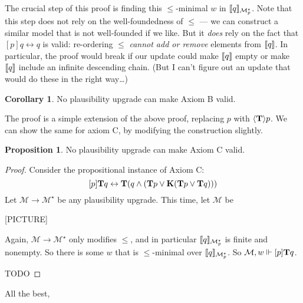 \documentclass[letterpaper]{article}
\theoremstyle{definition}
\newtheorem{corollary}{Corollary}
\newtheorem{proposition}{Proposition}
\newcommand{\semantics}[1]{[\![\mbox{\em $ #1 $\/}]\!]}
\newcommand{\Model}{\mathcal{M}}
\newcommand{\Typ}[1]{\textrm{\textup{\textbf{T}}} #1}
\newcommand{\Know}[1]{\textrm{\textup{\textbf{K}}} #1}
\newcommand{\Update}[1]{[#1]}
\newcommand{\diaTyp}[1]{\langle \textrm{\textup{\textbf{T}}} \rangle #1}
\begin{document}
The crucial step of this proof is finding this ${\leq}$-minimal $w$ in $\semantics{q}_{\Model^\star_p}$.  Note that this step does not rely on the well-foundedness of $\leq$ --- we can construct a similar model that is not well-founded if we like.  But it \emph{does} rely on the fact that $\Update{p} q \leftrightarrow q$ is valid: re-ordering $\leq$ \emph{cannot add or remove} elements from $\semantics{q}$.  In particular, the proof would break if our update could make $\semantics{q}$ empty or make $\semantics{q}$ include an infinite descending chain.  (But I can't figure out an update that would do these in the right way\ldots)

\begin{corollary}
    No plausibility upgrade can make Axiom B valid.
\end{corollary}

The proof is a simple extension of the above proof, replacing $p$ with $\diaTyp{p}$.  We can show the same for axiom C, by modifying the construction slightly.

\begin{proposition}
    No plausibility upgrade can make Axiom C valid.
\end{proposition}
\begin{proof}
    Consider the propositional instance of Axiom C:
    \[
        \Update{p} \Typ{q} \leftrightarrow 
        \Typ{(q \land (\Typ{p} \lor \Know{(\Typ{p} \lor \Typ{q})}))}
    \]
    Let $\Model \to \Model^\star$ be any plausibility upgrade.  This time, let $\Model$ be
    
    [PICTURE]

    Again, $\Model \to \Model^\star$ only modifies $\leq$, and in particular $\semantics{q}_{\Model^\star_p}$ is finite and nonempty.  So there is some $w$ that is ${\leq}$-minimal over $\semantics{q}_{\Model^\star_p}$.  So $\Model, w \Vdash \Update{p} \Typ{q}$.  
    
    TODO
\end{proof}

\closing{All the best,}



\end{document}
